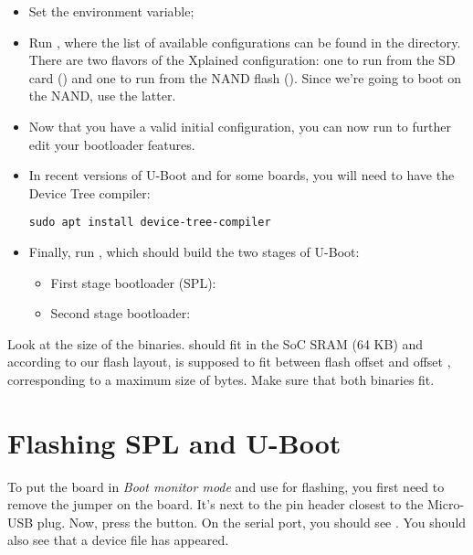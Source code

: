 \begin{itemize}

\item Set the  environment variable;

\item Run , where the list of available
  configurations can be found in the  directory. There
  are two flavors of the Xplained configuration: one to run from the
  SD card () and one to run from the NAND
  flash (). Since we're going to boot
  on the NAND, use the latter.

\item Now that you have a valid initial configuration, you can now
  run  to further edit your bootloader features.

\item In recent versions of U-Boot and for some boards, you will
  need to have the Device Tree compiler:

\begin{verbatim}
sudo apt install device-tree-compiler
\end{verbatim}

\item Finally, run , which should build the two stages of U-Boot:
\begin{itemize}
  \item First stage bootloader (SPL): 
  \item Second stage bootloader: 
\end{itemize}

\end{itemize}

Look at the size of the binaries.  should fit
in the SoC SRAM (64 KB) and according to our flash layout, 
is supposed to fit between flash offset  and offset ,
corresponding to a maximum size of  bytes.  Make sure that
both binaries fit.

\section{Flashing SPL and U-Boot}

To put the board in {\em Boot monitor mode} and use  for
flashing, you first need to remove the  jumper on the board.
It's next to the pin header closest to the Micro-USB plug.
Now, press the  button.  On the serial port, you should see
. You should also see that a  device
file has appeared.

